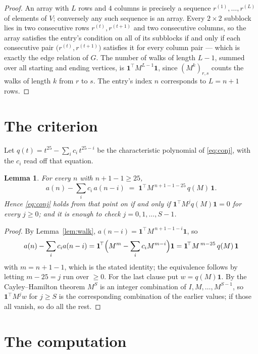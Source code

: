 \documentclass[11pt,a4paper]{article}
\theoremstyle{plain}
\newtheorem{lemma}[theorem]{Lemma}
\theoremstyle{definition}
\begin{document}
\begin{proof}
An array with $L$ rows and $4$ columns is precisely a sequence
$r^{(1)},\dots,r^{(L)}$ of elements of $V$; conversely any such sequence is an array.
Every $2\times2$ subblock lies in two consecutive rows $r^{(t)},r^{(t+1)}$ and two
consecutive columns, so the array satisfies the entry's condition on all of its subblocks
if and only if each consecutive pair $\bigl(r^{(t)},r^{(t+1)}\bigr)$ satisfies it for
every column pair --- which is exactly the edge relation of $G$. The number of walks of
length $L-1$, summed over all starting and ending vertices, is
$\mathbf{1}^{\!\top}M^{L-1}\mathbf{1}$, since $(M^{k})_{r,s}$ counts the walks of
length $k$ from $r$ to $s$. The entry's index $n$ corresponds to $L=n+1$ rows.
\end{proof}

\section{The criterion}

Let $q(t)=t^{25}-\sum_i c_i\,t^{25-i}$ be the characteristic polynomial of
\eqref{eq:conj}, with the $c_i$ read off that equation.

\begin{lemma}\label{lem:crit}
For every $n$ with $n+1-1\ge25$,
\[
a(n)-\sum_i c_i\,a(n-i)\;=\;\mathbf{1}^{\!\top}M^{\,n+1-1-25}\,q(M)\,\mathbf{1} .
\]
Hence \eqref{eq:conj} holds from that point on if and only if
$\mathbf{1}^{\!\top}M^{j}q(M)\mathbf{1}=0$ for every $j\ge0$; and it is enough to check
$j=0,1,\dots,S-1$.
\end{lemma}

\begin{proof}
By Lemma~\ref{lem:walk}, $a(n-i)=\mathbf{1}^{\!\top}M^{\,n+1-1-i}\mathbf{1}$, so
\[
a(n)-\sum_i c_i a(n-i)
=\mathbf{1}^{\!\top}\Bigl(M^{m}-\sum_i c_i M^{m-i}\Bigr)\mathbf{1}
=\mathbf{1}^{\!\top}M^{\,m-25}\,q(M)\,\mathbf{1}
\]
with $m=n+1-1$, which is the stated identity; the equivalence follows by letting
$m-25=j$ run over $\ge0$. For the last clause put $w=q(M)\mathbf{1}$. By the
Cayley--Hamilton theorem $M^{S}$ is an integer combination of $I,M,\dots,M^{S-1}$, so
$\mathbf{1}^{\!\top}M^{j}w$ for $j\ge S$ is the corresponding combination of the earlier
values; if those all vanish, so do all the rest.
\end{proof}

\section{The computation}
\end{document}
